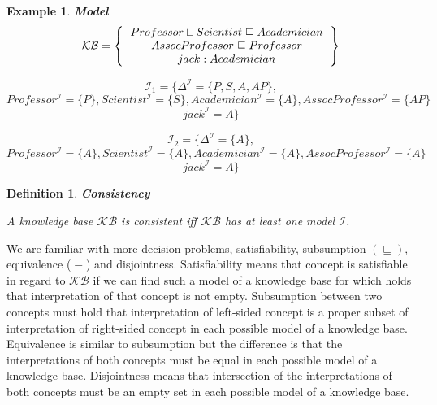 \documentclass[12pt,a4paper]{article}
\newtheorem{definition}{Definition}[subsection]
\newtheorem{example}{Example}[subsection]
\begin{document}
\begin{example}{\textbf{Model}}
	\label{example:model}
	\[ 
	\mathcal{KB} = \left\{
	\begin{tabular}{c c}
	$Professor \sqcup Scientist \sqsubseteq Academician$ \\
	$AssocProfessor \sqsubseteq Professor$ \\
	$jack : Academician$ \\
	\end{tabular}
	\right \}
	\]

	\[ \mathcal{I}_{1} = \{  \Delta^{\mathcal{I}} = \{ P,S,A,AP \}, \]	
	\[ Professor^{\mathcal{I}} = \{P\}, Scientist^{\mathcal{I}} = \{S\}, Academician^{\mathcal{I}} = \{A\}, AssocProfessor^{\mathcal{I}} = \{AP\} \]
	\[ jack^{\mathcal{I}} = A \} \]	

	\[ \mathcal{I}_{2} = \{  \Delta^{\mathcal{I}} = \{ A \}, \]	
	\[ Professor^{\mathcal{I}} = \{A\}, Scientist^{\mathcal{I}} = \{A\}, Academician^{\mathcal{I}} = \{A\}, AssocProfessor^{\mathcal{I}} = \{A\} \]
	\[ jack^{\mathcal{I}} = A \} \]		
\end{example}

\begin{definition}{\textbf{Consistency}}
	
	A knowledge base $\mathcal{KB}$ is consistent iff $\mathcal{KB}$ has at least one model $\mathcal{I}$.
\end{definition}

We are familiar with more decision problems, satisfiability, subsumption $(\sqsubseteq)$, equivalence ($\equiv$) and disjointness. Satisfiability means that concept is satisfiable in regard to $\mathcal{KB}$ if we can find such a model of a knowledge base for which holds that interpretation of that concept is not empty. Subsumption between two concepts must hold that interpretation of left-sided concept is a proper subset of interpretation of right-sided concept in each possible model of a knowledge base. Equivalence is similar to subsumption but the difference is that the interpretations of both concepts must be equal in each possible model of a knowledge base. Disjointness means that intersection of the interpretations of both concepts must be an empty set in each possible model of a knowledge base.
\end{document}
